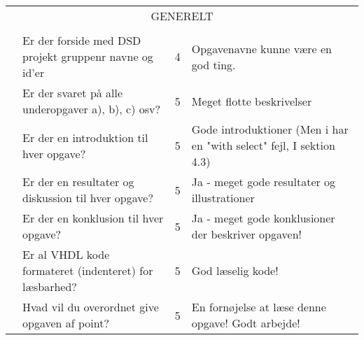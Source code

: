 \begin{table}[h]
    \small
    \begin{tabularx}{\textwidth}{p{3.5cm}Xp{5mm}X} &                                                        &                                                                          \\\midrule
        \multicolumn{4}{c}{GENERELT}                                                                                                                                       \\\midrule
                                       &                                                        &   &                                                                      \\
                                       & Er der forside med DSD projekt gruppenr navne og id'er & 4 & Opgavenavne kunne være en god ting.                                  \\
                                       & Er der svaret på alle underopgaver a), b), c) osv?     & 5 & Meget flotte beskrivelser                                            \\
                                       & Er der en introduktion til hver opgave?                & 5 & Gode introduktioner (Men i har en "with select" fejl, I sektion 4.3) \\
                                       & Er der en resultater og diskussion til hver opgave?    & 5 & Ja - meget gode resultater og illustrationer                         \\
                                       & Er der en konklusion til hver opgave?                  & 5 & Ja - meget gode konklusioner der beskriver opgaven!                  \\
                                       & Er al VHDL kode formateret (indenteret) for læsbarhed? & 5 & God læselig kode!                                                    \\
                                       & Hvad vil du overordnet give opgaven af point?          & 5 & En fornøjelse at læse denne opgave! Godt arbejde!                    \\ \bottomrule
    \end{tabularx}
\end{table}


